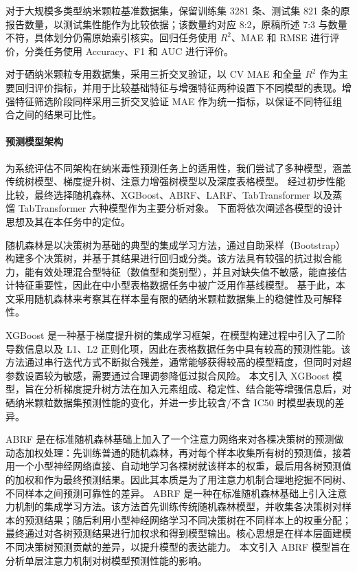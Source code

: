 \documentclass[letterpaper]{article}
\begin{document}
对于大规模多类型纳米颗粒基准数据集，保留训练集 3281 条、测试集 821 条的原报告数量，以测试集性能作为比较依据；该数量约对应 8:2，原稿所述 7:3 与数量不符，具体划分仍需原始索引核实。回归任务使用 $R^2$、MAE 和 RMSE 进行评价，分类任务使用 Accuracy、F1 和 AUC 进行评价。

对于硒纳米颗粒专用数据集，采用三折交叉验证，以 CV MAE 和全量 $R^2$ 作为主要回归评价指标，并用于比较基础特征与增强特征两种设置下不同模型的表现。增强特征筛选阶段同样采用三折交叉验证 MAE 作为统一指标，以保证不同特征组合之间的结果可比性。

\paragraph{预测模型架构}
为系统评估不同架构在纳米毒性预测任务上的适用性，我们尝试了多种模型，涵盖传统树模型、梯度提升树、注意力增强树模型以及深度表格模型。
经过初步性能比较，最终选择随机森林、XGBoost、ABRF、LARF、TabTransformer 以及蒸馏 TabTransformer 六种模型作为主要分析对象。
下面将依次阐述各模型的设计思想及其在本任务中的定位。

随机森林是以决策树为基础的典型的集成学习方法，通过自助采样（Bootstrap）构建多个决策树，并基于其结果进行回归或分类。该方法具有较强的抗过拟合能力，能有效处理混合型特征（数值型和类别型），并且对缺失值不敏感，能直接估计特征重要性，因此在中小型表格数据任务中被广泛用作基线模型。
基于此，本文采用随机森林来考察其在样本量有限的硒纳米颗粒数据集上的稳健性及可解释性。


XGBoost 是一种基于梯度提升树的集成学习框架，在模型构建过程中引入了二阶导数信息以及 L1、L2 正则化项，因此在表格数据任务中具有较高的预测性能。该方法通过串行迭代方式不断拟合残差，通常能够获得较高的模型精度，但同时对超参数设置较为敏感，需要通过合理调参降低过拟合风险。
本文引入 XGBoost 模型，旨在分析梯度提升树方法在加入元素组成、稳定性、结合能等增强信息后，对硒纳米颗粒数据集预测性能的变化，并进一步比较含/不含 IC50 时模型表现的差异。

ABRF 是在标准随机森林基础上加入了一个注意力网络来对各棵决策树的预测做动态加权处理：先训练普通的随机森林，再对每个样本收集所有树的预测值，接着用一个小型神经网络直接、自动地学习各棵树就该样本的权重，最后用各树预测值的加权和作为最终预测结果。因此其本质是为了用注意力机制合理地挖掘不同树、不同样本之间预测可靠性的差异。
ABRF 是一种在标准随机森林基础上引入注意力机制的集成学习方法。该方法首先训练传统随机森林模型，并收集各决策树对样本的预测结果；随后利用小型神经网络学习不同决策树在不同样本上的权重分配；最终通过对各树预测结果进行加权求和得到模型输出。核心思想是在样本层面建模不同决策树预测贡献的差异，以提升模型的表达能力。
本文引入 ABRF 模型旨在分析单层注意力机制对树模型预测性能的影响。
\end{document}
